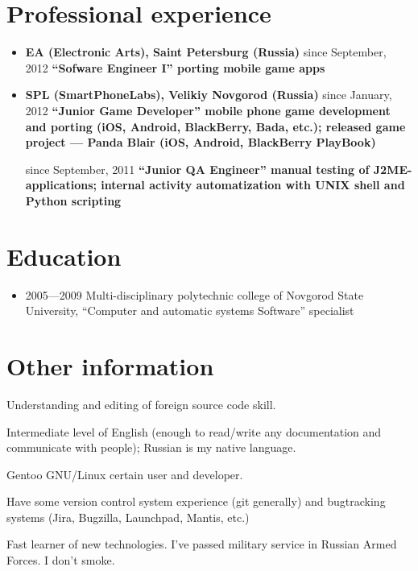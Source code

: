 \section{Professional experience}
\begin{itemize}
\item {
\fontsize{14pt}{14pt}\selectfont
\bfseries EA (Electronic Arts)\mdseries, Saint Petersburg (Russia)
}
\subitem since September, 2012 \bfseries ``Sofware Engineer I''\mdseries
\subsubitem porting mobile game apps

\item {
\fontsize{14pt}{14pt}\selectfont
\bfseries SPL (SmartPhoneLabs)\mdseries, Velikiy Novgorod (Russia)
}
\subitem since January, 2012 \bfseries ``Junior Game Developer''\mdseries
\subsubitem mobile phone game development and porting
(iOS, Android, BlackBerry, Bada, etc.);
\subsubitem released game project --- Panda Blair (iOS, Android, BlackBerry PlayBook)

\subitem since September, 2011 \bfseries ``Junior QA Engineer''\mdseries
\subsubitem manual testing of J2ME-applications;
\subsubitem internal activity automatization with UNIX shell and Python scripting
\end{itemize}

\section{Education}
\begin{itemize}
\item 2005---2009 Multi-disciplinary polytechnic college of
Novgorod State University,
``Computer and automatic systems Software'' specialist
\end{itemize}

\section{Other information}
Understanding and editing of foreign source code skill.

Intermediate level of English
(enough to read/write any documentation and communicate with people);
Russian is my native language.

Gentoo GNU/Linux certain user and developer.

Have some version control system experience (git generally) and
bugtracking systems (Jira, Bugzilla, Launchpad, Mantis, etc.)

Fast learner of new technologies.
I've passed military service in Russian Armed Forces.
I don't smoke.
